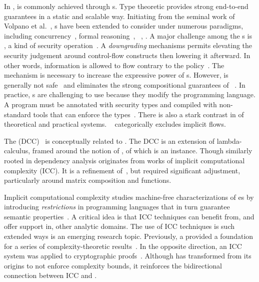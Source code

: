 In ,  is commonly achieved
through s. Type theoretic 
provides strong end-to-end  guarantees in a static and
scalable way. Initiating from the seminal work of Volpano et
al.~\cite{volpano1996}, s have been extended to
consider  under numerous paradigms, including
concurrency~\cite{volpano1998,derakhshan2024,frumin2021}, formal reasoning~\cite{nelson2020,frumin2021}, ~\cite{barthe2004}, \etc. A major challenge among the s is \emph{}, a kind of security
 operation~\cite{cecchetti2017}. A \emph{downgrading}
mechanisms permits elevating the security judgement around control-flow
constructs then lowering it afterward. In other words, information is allowed to
flow contrary to the policy~\cite{cecchetti2017}. The mechanism is necessary to
increase the expressive power of s. However,  is generally not safe~\cite{derakhshan2024}
and eliminates the strong compositional guarantees of
~\cite{cecchetti2017}. In practice, s are challenging to use because they modify the programming language. A
program must be annotated with security types and compiled with non-standard
tools that can enforce the types~\cite{lamba2024}. There is also a stark
contrast in  of theoretical and practical systems.
\Eg~\cite{huang2014} categorically excludes implicit flows.

The  (DCC)~\cite{abadi1999b} is conceptually
related to \lname. The DCC is an extension of
lambda-calculus, framed around the notion of
, of which  is an instance. Though
similarly rooted in dependency analysis \lname
originates from works of implicit computational complexity (ICC). It is a
refinement of~\cite{moyen20172,aubert20232}, but \lname required significant
adjustment, particularly around matrix composition and functions.

Implicit computational complexity studies machine-free characterizations of
es by introducing \emph{restrictions} in programming
languages that in turn guarantee semantic properties~\cite{dallago2011}. A
critical idea is that ICC techniques can benefit from, and offer support in,
other analytic domains. The use of ICC techniques is such extended ways is an
emerging research topic. Previously, a   provided a foundation for a series of
complexity-theoretic results~\cite{marion2011,hainry2023}. In the opposite
direction, an ICC system was applied to cryptographic
proofs~\cite{baillot2019}. Although \lname has transformed from its origins to
not enforce complexity bounds, it reinforces the bidirectional connection
between ICC and .

